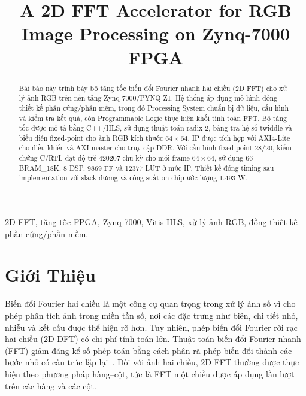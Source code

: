 ﻿\documentclass[conference]{IEEEtran}
\begin{document}
\title{A 2D FFT Accelerator for RGB Image Processing on Zynq-7000 FPGA}

\author{
}

\maketitle

\begin{abstract}
    Bài báo này trình bày bộ tăng tốc biến đổi Fourier nhanh hai chiều (2D FFT) cho xử lý ảnh RGB trên nền tảng Zynq-7000/PYNQ-Z1. Hệ thống áp dụng mô hình đồng thiết kế phần cứng/phần mềm, trong đó Processing System chuẩn bị dữ liệu, cấu hình và kiểm tra kết quả, còn Programmable Logic thực hiện khối tính toán FFT. Bộ tăng tốc được mô tả bằng C++/HLS, sử dụng thuật toán radix-2, bảng tra hệ số twiddle và biểu diễn fixed-point cho ảnh RGB kích thước $64\times64$. IP được tích hợp với AXI4-Lite cho điều khiển và AXI master cho truy cập DDR. Với cấu hình fixed-point 28/20, kiểm chứng C/RTL đạt độ trễ 420207 chu kỳ cho mỗi frame $64\times64$, sử dụng 66 BRAM\_18K, 8 DSP, 9869 FF và 12377 LUT ở mức IP. Thiết kế đóng timing sau implementation với slack dương và công suất on-chip ước lượng 1.493 W.
\end{abstract}

\begin{IEEEkeywords}
    2D FFT, tăng tốc FPGA, Zynq-7000, Vitis HLS, xử lý ảnh RGB, đồng thiết kế phần cứng/phần mềm.
\end{IEEEkeywords}

\section{Giới Thiệu}
\label{sec:introduction}
Biến đổi Fourier hai chiều là một công cụ quan trọng trong xử lý ảnh số vì cho phép phân tích ảnh trong miền tần số, nơi các đặc trưng như biên, chi tiết nhỏ, nhiễu và kết cấu được thể hiện rõ hơn. Tuy nhiên, phép biến đổi Fourier rời rạc hai chiều (2D DFT) có chi phí tính toán lớn. Thuật toán biến đổi Fourier nhanh (FFT) giảm đáng kể số phép toán bằng cách phân rã phép biến đổi thành các bước nhỏ có cấu trúc lặp lại~\cite{cooley_tukey_1965}. Đối với ảnh hai chiều, 2D FFT thường được thực hiện theo phương pháp hàng--cột, tức là FFT một chiều được áp dụng lần lượt trên các hàng và các cột.
\end{document}
